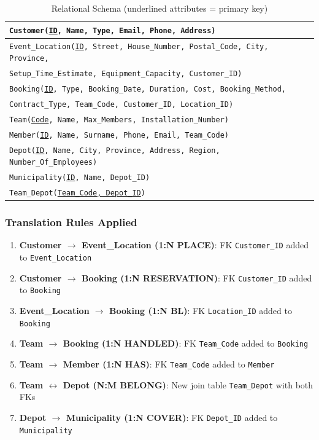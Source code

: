 \begin{table}[H]
    \renewcommand{\arraystretch}{1.3}
    \begin{tabularx}{\textwidth}{|X|}
    \hline
    \texttt{Customer(\underline{ID}, Name, Type, Email, Phone, Address)} \\ \hline
    \texttt{Event\_Location(\underline{ID}, Street, House\_Number, Postal\_Code, City, Province,} \\
    \quad \texttt{Setup\_Time\_Estimate, Equipment\_Capacity, Customer\_ID)} \\ \hline
    \texttt{Booking(\underline{ID}, Type, Booking\_Date, Duration, Cost, Booking\_Method,} \\
    \quad \texttt{Contract\_Type, Team\_Code, Customer\_ID, Location\_ID)} \\ \hline
    \texttt{Team(\underline{Code}, Name, Max\_Members, Installation\_Number)} \\ \hline
    \texttt{Member(\underline{ID}, Name, Surname, Phone, Email, Team\_Code)} \\ \hline
    \texttt{Depot(\underline{ID}, Name, City, Province, Address, Region, Number\_Of\_Employees)} \\ \hline
    \texttt{Municipality(\underline{ID}, Name, Depot\_ID)} \\ \hline
    \texttt{Team\_Depot(\underline{Team\_Code, Depot\_ID})} \\ \hline
    \end{tabularx}
    \caption{Relational Schema (underlined attributes = primary key)}
\end{table}

\subsubsection{Translation Rules Applied}
\begin{enumerate}
    \item \textbf{Customer $\to$ Event\_Location (1:N PLACE)}: FK \texttt{Customer\_ID} added to \texttt{Event\_Location}
    \item \textbf{Customer $\to$ Booking (1:N RESERVATION)}: FK \texttt{Customer\_ID} added to \texttt{Booking}
    \item \textbf{Event\_Location $\to$ Booking (1:N BL)}: FK \texttt{Location\_ID} added to \texttt{Booking}
    \item \textbf{Team $\to$ Booking (1:N HANDLED)}: FK \texttt{Team\_Code} added to \texttt{Booking}
    \item \textbf{Team $\to$ Member (1:N HAS)}: FK \texttt{Team\_Code} added to \texttt{Member}
    \item \textbf{Team $\leftrightarrow$ Depot (N:M BELONG)}: New join table \texttt{Team\_Depot} with both FKs
    \item \textbf{Depot $\to$ Municipality (1:N COVER)}: FK \texttt{Depot\_ID} added to \texttt{Municipality}
\end{enumerate}
